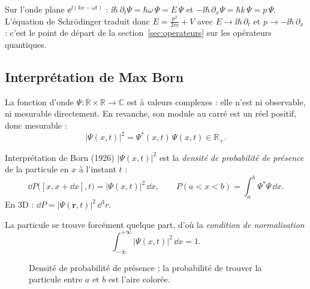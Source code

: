 \begin{remarque}
Sur l'onde plane $\ee^{\ii(kx-\omega t)}$ :
$\ii\hbar\,\partial_t\Psi = \hbar\omega\,\Psi = E\,\Psi$ et
$-\ii\hbar\,\partial_x\Psi = \hbar k\,\Psi = p\,\Psi$. L'équation de Schrödinger
traduit donc $E = \frac{p^2}{2m} + V$ avec $E\to\ii\hbar\,\partial_t$ et
$p\to-\ii\hbar\,\partial_x$ : c'est le point de départ de la
section~\ref{sec:operateurs} sur les opérateurs quantiques.
\end{remarque}

\subsection{Interprétation de Max Born}\label{sec:born}

La fonction d'onde $\Psi:\mathbb{R}\times\mathbb{R}\to\mathbb{C}$ est à valeurs
complexes : elle n'est ni observable, ni mesurable directement. En revanche, son
module au carré est un réel positif, donc mesurable :
\[
  |\Psi(x,t)|^2 = \Psi^*(x,t)\,\Psi(x,t) \in \mathbb{R}_+ .
\]

\begin{definition}{Interprétation de Born (1926)}
$|\Psi(x,t)|^2$ est la \emph{densité de probabilité de présence} de la particule
en $x$ à l'instant $t$ :
\[
  \dd P\big([x,x+\dd x],t\big) = |\Psi(x,t)|^2\,\dd x ,
  \qquad
  P(a<x<b) = \int_a^b \Psi^*\Psi\,\dd x .
\]
En 3D : $\dd P = |\Psi(\mathbf{r},t)|^2\,\dd^3 r$.
\end{definition}

La particule se trouve forcément quelque part, d'où la \emph{condition de
normalisation}
\[
  \int_{-\infty}^{+\infty} |\Psi(x,t)|^2\,\dd x = 1 .
\]

\begin{figure}[!ht]
\centering
{}
\caption{Densité de probabilité de présence ; la probabilité de trouver la
particule entre $a$ et $b$ est l'aire colorée.}
\end{figure}


